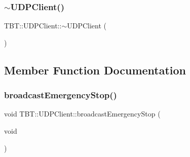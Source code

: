 \subsubsection{\texorpdfstring{$\sim$\+U\+D\+P\+Client()}{~UDPClient()}}
{\footnotesize\ttfamily T\+B\+T\+::\+U\+D\+P\+Client\+::$\sim$\+U\+D\+P\+Client (\begin{DoxyParamCaption}{ }\end{DoxyParamCaption})\hspace{0.3cm}{\ttfamily [virtual]}}



\subsection{Member Function Documentation}
\mbox{\label{classTBT_1_1UDPClient_a378d141aa807a685b1e70adaacd5fc17_a378d141aa807a685b1e70adaacd5fc17}} 
\subsubsection{\texorpdfstring{broadcast\+Emergency\+Stop()}{broadcastEmergencyStop()}}
{\footnotesize\ttfamily void T\+B\+T\+::\+U\+D\+P\+Client\+::broadcast\+Emergency\+Stop (\begin{DoxyParamCaption}\item[{void}]{ }\end{DoxyParamCaption})\hspace{0.3cm}{\ttfamily [virtual]}}


